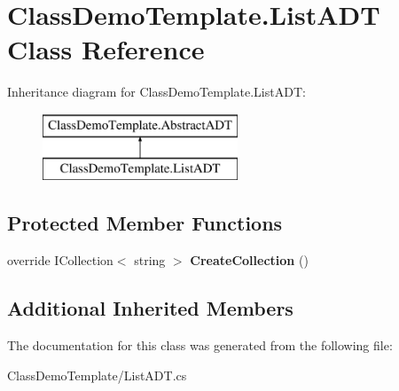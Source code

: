 \hypertarget{class_class_demo_template_1_1_list_a_d_t}{}\section{Class\+Demo\+Template.\+List\+A\+DT Class Reference}
\label{class_class_demo_template_1_1_list_a_d_t}
Inheritance diagram for Class\+Demo\+Template.\+List\+A\+DT\+:\begin{figure}[H]
\begin{center}
\leavevmode
\includegraphics[height=2.000000cm]{class_class_demo_template_1_1_list_a_d_t}
\end{center}
\end{figure}
\subsection*{Protected Member Functions}
\begin{DoxyCompactItemize}
\item 
\mbox{\label{class_class_demo_template_1_1_list_a_d_t_ab74899ae4501f5476a7f38c8335be3d2}} 
override I\+Collection$<$ string $>$ {\bfseries Create\+Collection} ()
\end{DoxyCompactItemize}
\subsection*{Additional Inherited Members}


The documentation for this class was generated from the following file\+:\begin{DoxyCompactItemize}
\item 
Class\+Demo\+Template/List\+A\+D\+T.\+cs\end{DoxyCompactItemize}
